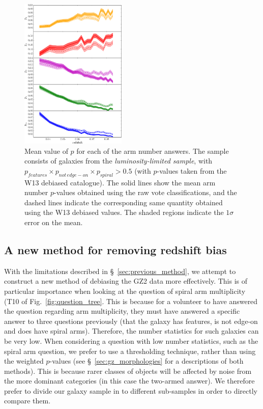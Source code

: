 \documentclass[useAMS,usenatbib]{mn2e}
\begin{document}
\begin{figure}
		\centering

        \includegraphics[width=0.45\textwidth]{Images/Bias/Biases/mean_arm_fractions.pdf}

        \caption{Mean value of $p$ for each of the arm number answers. The sample consists of galaxies from the \textit{luminosity-limited sample}, with $p_{features} \times p_{not \, edge-on} \times p_{spiral} > 0.5$ (with $p$-values taken from the W13 debiased catalogue). The solid lines show the mean arm number $p$-values obtained using the raw vote classifications, and the dashed lines indicate the corresponding same quantity obtained using the W13 debiased values. The shaded regions indicate the $1 \sigma$ error on the mean.}

        \label{fig:arm_bias}

\end{figure}
\subsection{A new method for removing redshift bias}
\label{sec:new_method}

With the limitations described in \S~\ref{sec:previous_method}, we attempt to construct a new method of debiasing the GZ2 data more effectively. This is of particular importance when looking at the question of spiral arm multiplicity (T10 of Fig.~\ref{fig:question_tree}. This is because for a volunteer to have answered the question regarding arm multiplicity, they must have answered a specific answer to three questions previously (that the galaxy has features, is not edge-on and does have spiral arms). Therefore, the number statistics for such galaxies can be very low. When considering a question with low number statistics, such as the spiral arm question, we prefer to use a thresholding technique, rather than using the weighted $p$-values (see \S~\ref{sec:gz_morphologies} for a descriptions of both methods). This is because rarer classes of objects will be affected by noise from the more dominant categories (in this case the two-armed answer). We therefore prefer to divide our galaxy sample in to different sub-samples in order to directly compare them.
\end{document}
